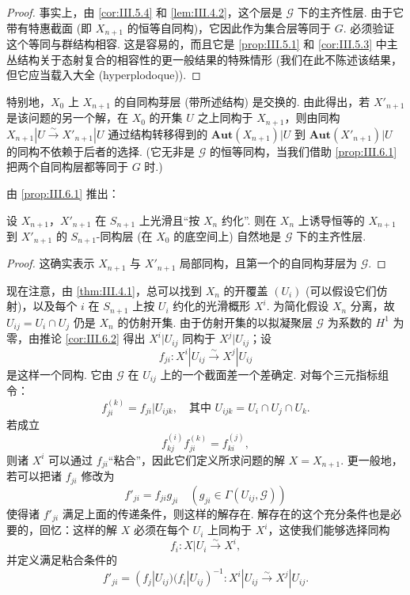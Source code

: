 \begin{proof}
事实上，由 \ref{cor:III.5.4} 和 \ref{lem:III.4.2}，这个层是 $\mathcal{G}$ 下的主齐性层. 由于它带有特惠截面 (即 $X_{n+1}$ 的恒等自同构)，它因此作为集合层等同于 $G$. 必须验证这个等同与群结构相容. 这是容易的，而且它是 \ref{prop:III.5.1} 和 \ref{cor:III.5.3} 中主丛结构关于态射复合的相容性的更一般结果的特殊情形 (我们在此不陈述该结果，但它应当载入大全 (hyperplodoque)).
\end{proof}

特别地，$X_0$ 上 $X_{n+1}$ 的自同构芽层 (带所述结构) 是交换的. 由此得出，若 $X'_{n+1}$ 是该问题的另一个解，在 $X_0$ 的开集 $U$ 之上同构于 $X_{n+1}$，则由同构 $X_{n+1}|U \stackrel{\sim}{\longrightarrow} X'_{n+1}|U$ 通过结构转移得到的 $\mathbf{Aut}(X_{n+1})|U$ 到 $\mathbf{Aut}(X'_{n+1})|U$ 的同构不依赖于后者的选择. (它无非是 $\mathcal{G}$ 的恒等同构，当我们借助 \ref{prop:III.6.1} 把两个自同构层都等同于 $G$ 时.)

由 \ref{prop:III.6.1} 推出：

\begin{corollary}\label{cor:III.6.2}
设 $X_{n+1}$，$X'_{n+1}$ 在 $S_{n+1}$ 上光滑且``按 $X_n$ 约化''. 则在 $X_n$ 上诱导恒等的 $X_{n+1}$ 到 $X'_{n+1}$ 的 $S_{n+1}$-同构层 (在 $X_0$ 的底空间上) 自然地是 $\mathcal{G}$ 下的主齐性层.
\end{corollary}

\begin{proof}
这确实表示 $X_{n+1}$ 与 $X'_{n+1}$ 局部同构，且第一个的自同构芽层为 $\mathcal{G}$.
\end{proof}

现在注意，由 \ref{thm:III.4.1}，总可以找到 $X_n$ 的开覆盖 $(U_i)$ (可以假设它们仿射)，以及每个 $i$ 在 $S_{n+1}$ 上按 $U_i$ 约化的光滑概形 $X^i$. 为简化假设 $X_n$ 分离，故 $U_{ij} = U_i \cap U_j$ 仍是 $X_n$ 的仿射开集. 由于仿射开集的以拟凝聚层 $\mathcal{G}$ 为系数的 $H^1$ 为零，由推论 \ref{cor:III.6.2} 得出 $X^i|U_{ij}$ 同构于 $X^j|U_{ij}$；设
\[
f_{ji} \colon X^i|U_{ij} \xrightarrow{\sim} X^j|U_{ij}
\]
是这样一个同构. 它由 $\mathcal{G}$ 在 $U_{ij}$ 上的一个截面差一个差确定. 对每个三元指标组令：
\[
f_{ji}^{(k)} = f_{ji}|U_{ijk}, \quad \text{其中 } U_{ijk} = U_i \cap U_j \cap U_k.
\]
若成立
\begin{equation}
f_{kj}^{(i)} f_{ji}^{(k)} = f_{ki}^{(j)}, \tag{1}
\label{eq:III.1}
\end{equation}
则诸 $X^i$ 可以通过 $f_{ji}$``粘合''，因此它们定义所求问题的解 $X = X_{n+1}$. 更一般地，若可以把诸 $f_{ji}$ 修改为
\begin{equation}
f'_{ji} = f_{ji} g_{ji} \quad (g_{ji} \in \Gamma(U_{ij}, \mathcal{G})) \tag{2}
\label{eq:III.2}
\end{equation}
使得诸 $f'_{ji}$ 满足上面的传递条件，则这样的解存在. 解存在的这个充分条件也是必要的，回忆：这样的解 $X$ 必须在每个 $U_i$ 上同构于 $X^i$，这使我们能够选择同构
\[
f_i \colon X|U_i \stackrel{\sim}{\longrightarrow} X^i,
\]
并定义满足粘合条件的
\[
f'_{ji} = (f_j|U_{ij})(f_i|U_{ij})^{-1} \colon X^i|U_{ij} \xrightarrow{\sim} X^j|U_{ij}.
\]

